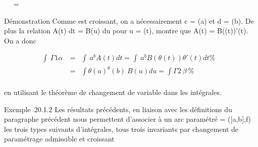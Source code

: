 \int  {}~\alpha~
=\int  {}~\beta~

Démonstration Comme \theta est croissant, on a nécessairement c = \theta(a) et d =
\theta(b). De plus la relation A(t) dt = B(u) du pour u = \theta(t), montre que
A(t) = B(\theta(t))\theta'(t). On a donc

\begin{align*} \int ~
\Gamma1\alpha~& =& \int ~
a^bA(t) dt =\int ~
a^bB(\theta(t))\theta'(t) dt\%& \\
& =& \int  \theta(a)^\theta(b)~B(u) du
=\int  \Gamma2~\beta~ \%&
\\ \end{align*}

en utilisant le théorème de changement de variable dans les intégrales.

Exemple~20.1.2 Les résultats précédents, en liaison avec les définitions
du paragraphe précédent nous permettent d'associer à un arc paramétré \Gamma
= ({[}a,b{]},f) les trois types suivants d'intégrales, tous trois
invariants par changement de paramétrage admissible et croissant

